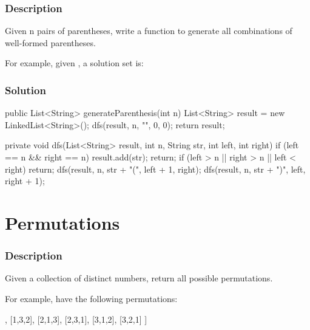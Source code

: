 \subsubsection{Description}
Given n pairs of parentheses, write a function to generate all combinations of well-formed parentheses.

For example, given , a solution set is:
\begin{Code}
[
  "((()))",
  "(()())",
  "(())()",
  "()(())",
  "()()()"
]
\end{Code}

\subsubsection{Solution}

\begin{Code}
public List<String> generateParenthesis(int n) {
    List<String> result = new LinkedList<String>();
    dfs(result, n, "", 0, 0);
    return result;
}

private void dfs(List<String> result, int n, String str, int left, int right) {
    if (left == n && right == n) {
        result.add(str);
        return;
    }
    if (left > n || right > n || left < right) {
        return;
    }
    dfs(result, n, str + "(", left + 1, right);
    dfs(result, n, str + ")", left, right + 1);
}
\end{Code}

\newpage

\section{Permutations} %

\subsubsection{Description}
Given a collection of distinct numbers, return all possible permutations.

For example, \code{[1,2,3]} have the following permutations:
\begin{Code}
[
  [1,2,3],
  [1,3,2],
  [2,1,3],
  [2,3,1],
  [3,1,2],
  [3,2,1]
]
\end{Code}

